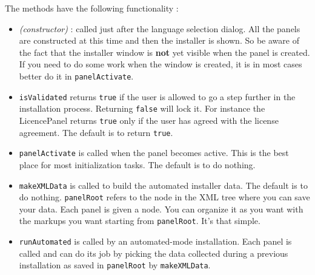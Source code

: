 The methods have the following functionality :\\
\begin{itemize}

  \item \textit{(constructor)} : called just after the language
  selection dialog. All the panels are constructed at this time and then
  the installer is shown. So be aware of the fact that the installer
  window is \textbf{not} yet visible when the panel is created. If you
  need to do some work when the window is created, it is in most cases
  better do it in \texttt{panelActivate}.\\

  \item \texttt{isValidated} returns \texttt{true} if the user is
  allowed to go a step further in the installation process. Returning
  \texttt{false} will lock it. For instance the LicencePanel returns
  \texttt{true} only if the user has agreed with the license agreement.
  The default is to return \texttt{true}.\\
  
  \item \texttt{panelActivate} is called when the panel becomes active.
  This is the best place for most initialization tasks. The default is
  to do nothing.\\
  
  \item \texttt{makeXMLData} is called to build the automated installer
  data. The default is to do nothing. \texttt{panelRoot} refers to the
  node in the XML tree where you can save your data. Each panel is given
  a node. You can organize it as you want with the markups you want
  starting from \texttt{panelRoot}. It's that simple.\\
  
  \item \texttt{runAutomated} is called by an automated-mode
  installation. Each panel is called and can do its job by picking the
  data collected during a previous installation as saved in
  \texttt{panelRoot} by \texttt{makeXMLData}.\\

\end{itemize}\
